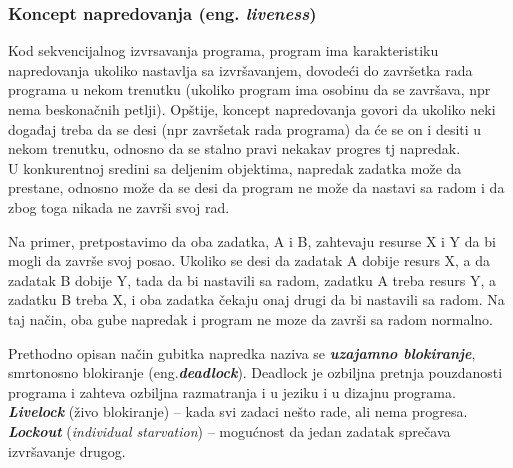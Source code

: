 \documentclass[../main.tex]{subfiles}
\begin{document}
\subsubsection{Koncept napredovanja (eng. {\it liveness})}

Kod sekvencijalnog izvrsavanja programa, program ima karakteristiku napredovanja ukoliko nastavlja sa izvršavanjem, dovodeći do završetka rada programa u nekom trenutku (ukoliko program ima osobinu da se završava, npr nema beskonačnih petlji). Opštije, koncept napredovanja govori da ukoliko neki događaj treba da se desi (npr završetak rada programa) da će se on i desiti u nekom trenutku, odnosno da se stalno pravi nekakav progres tj napredak. 
\\
U konkurentnoj sredini sa deljenim objektima, napredak zadatka može da prestane, odnosno može da se desi da program ne može da nastavi sa radom i da zbog toga nikada ne završi svoj rad.
\begin{boxprimer}
Na primer, pretpostavimo da oba zadatka, A i B, zahtevaju resurse X i Y da bi mogli da završe svoj posao. Ukoliko se desi da zadatak A dobije resurs X, a da zadatak B dobije Y, tada da bi nastavili sa radom, zadatku A treba resurs Y, a zadatku B treba X, i oba zadatka čekaju onaj drugi da bi nastavili sa radom. Na taj način, oba gube napredak i program ne moze da završi sa radom normalno.
\end{boxprimer}

Prethodno opisan način gubitka napredka naziva se {\it \bf uzajamno blokiranje}, smrtonosno blokiranje (eng.{\it \bf deadlock}). Deadlock je ozbiljna pretnja pouzdanosti programa i zahteva ozbiljna razmatranja i u jeziku i u dizajnu programa.
\\
{\it \bf Livelock} (živo blokiranje) -- kada svi zadaci nešto rade, ali nema progresa.
\\
{\it \bf Lockout} ({\it individual starvation}) -- mogućnost da jedan zadatak sprečava izvršavanje drugog.
\end{document}
